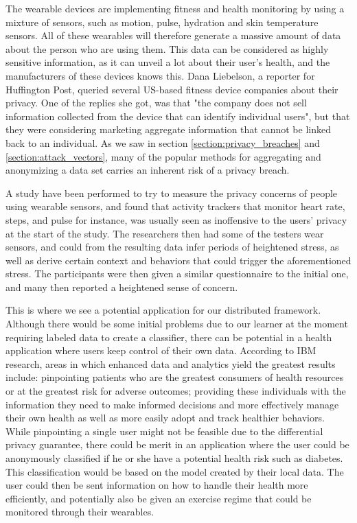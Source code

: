 The wearable devices are implementing fitness and health monitoring by using a mixture of sensors, such as motion, pulse, hydration and skin temperature sensors. All of these wearables will therefore generate a massive amount of data about the person who are using them. This data can be considered as highly sensitive information, as it can unveil a lot about their user's health, and the manufacturers of these devices knows this. Dana Liebelson, a reporter for Huffington Post, queried several US-based fitness device companies about their privacy. One of the replies she got, was that "the company does not sell information collected from the device that can identify individual users", but that they were considering marketing aggregate information that cannot be linked back to an individual\citep{liebelson2014wearables}. As we saw in section \ref{section:privacy_breaches} and \ref{section:attack_vectors}, many of the popular methods for aggregating and anonymizing a data set carries an inherent risk of a privacy breach.

A study \citep{raij2011privacyConcernWearables} have been performed to try to measure the privacy concerns of people using wearable sensors, and found that activity trackers that monitor heart rate, steps, and pulse for instance, was usually seen as inoffensive to the users’ privacy at the start of the study. The researchers then had some of the testers wear sensors, and could from the resulting data infer periods of heightened stress, as well as derive certain context and behaviors that could trigger the aforementioned stress. The participants were then given a similar questionnaire to the initial one, and many then reported a heightened sense of concern. 
  
This is where we see a potential application for our distributed framework. Although there would be some initial problems due to our learner at the moment requiring labeled data to create a classifier, there can be potential in a health application where users keep control of their own data. According to IBM research, areas in which enhanced data and analytics yield the greatest results include: pinpointing patients who are the greatest consumers of health resources or at the greatest risk for adverse outcomes; providing these individuals with the information they need to make informed decisions and more effectively manage their own health as well as more easily adopt and track healthier behaviors\citep{IBM2013reportBigDataHealth}. While pinpointing a single user might not be feasible due to the differential privacy guarantee, there could be merit in an application where the user could be anonymously classified if he or she have a potential health risk such as diabetes. This classification would be based on the model created by their local data. The user could then be sent information on how to handle their health more efficiently, and potentially also be given an exercise regime that could be monitored through their wearables. 

